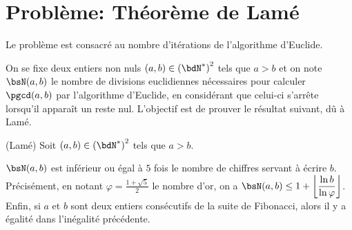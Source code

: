 \documentclass[a4paper,french,bookmarks]{article}
\begin{document}

\section*{Problème: Théorème de Lamé}
Le problème est consacré au nombre d’itérations de l’algorithme d’Euclide. 

On se fixe deux entiers non nuls $(a, b) \in \left(\bdN^*\right)^2$ tels que $a > b$ et on note $\bsN(a, b)$ le nombre de divisions euclidiennes nécessaires pour calculer $\pgcd(a,b)$ par l'algorithme d'Euclide, en considérant que celui-ci s'arrête lorsqu'il apparaît un reste nul. L’objectif est de prouver le résultat suivant, dû à Lamé. 

\begin{theorem*}{(Lamé)}{}
Soit $(a, b) \in \left(\bdN^*\right)^2$ tels que $a > b$.
\begin{enumerate}
    \ithand $\bsN(a, b)$ est inférieur ou égal à $5$ fois le nombre de chiffres servant à écrire $b$.
    \ithand Précisément, en notant $\varphi = \frac{1+\sqrt{5}}{2}$ le nombre d'or, on a $\bsN(a, b) \leq 1+\left\lfloor \dfrac{\ln b}{\ln \varphi}\right\rfloor$.
    \ithand Enfin, si $a$ et $b$ sont deux entiers consécutifs de la suite de Fibonacci, alors il y a égalité dans l’inégalité précédente.
\end{enumerate}
\end{theorem*}
\end{document}
